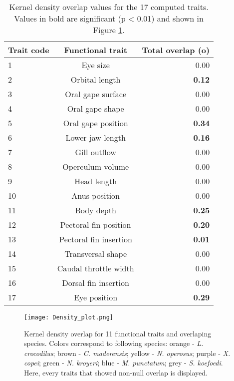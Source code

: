 \begin{table}[ht]
\centering
\caption{Kernel density overlap values for the 17 computed traits. Values in bold are significant (p < 0.01) and shown in Figure \ref{fig:dpo}.}
\label{table:kern_over_val}
\begin{adjustbox}{max width=1.1\textwidth,center}
\begin{tabular}{lcr}
  \hline
Trait code & Functional trait & Total overlap (o) \\ 
  \hline
1 & Eye size & 0.00 \\ 
  2 & Orbital length & \textbf{0.12} \\ 
  3 & Oral gape surface & 0.00 \\ 
  4 & Oral gape shape &0.00 \\ 
  5 & Oral gape position & \textbf{0.34} \\ 
  6 & Lower jaw length & \textbf{0.16} \\ 
  7 & Gill outflow & 0.00 \\ 
  8 & Operculum volume & 0.00 \\ 
  9 & Head length & 0.00 \\ 
  10 & Anus position & 0.00 \\ 
  11 & Body depth & \textbf{0.25} \\ 
  12 & Pectoral fin position & \textbf{0.20} \\ 
  13 & Pectoral fin insertion & \textbf{0.01} \\ 
  14 & Transversal shape & 0.00 \\ 
  15 & Caudal throttle width & 0.00 \\ 
  16 & Dorsal fin insertion & 0.00 \\ 
  17 & Eye position & \textbf{0.29} \\ 
   \hline
\end{tabular}
\end{adjustbox}
\end{table} 

\begin{figure} [!htbp]
	\begin{center}
		\texttt{[image: Density\_plot.png]}
	\end{center}
	\caption{Kernel density overlap for 11 functional traits and overlaping species. Colors correspond to following species: orange - \textit{L. crocodilus}; brown - \textit{C. maderensis}; yellow - \textit{N. operosus}; purple - \textit{X. copei}; green - \textit{N. kroyeri}; blue - \textit{M. punctatum}; grey - \textit{S. koefoedi}. Here, every traits that showed non-null overlap is displayed.}
	\label{fig:dpo}
\end{figure}